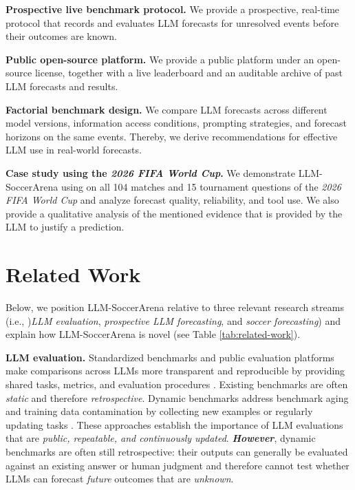 \documentclass[sigconf,nonacm]{acmart}
\newcommand{\arena}{\mbox{LLM-SoccerArena}\xspace}
\newcommand{\circnum}[2][tikzblue]{%
\tikz[baseline=-0.55ex]{
\node[
    circle,
    draw=#1,
    text=#1,
    line width=0.35pt,
    minimum size=1.0em,
    inner sep=0pt,
    font=\bfseries\fontsize{6.5}{6.5}\selectfont
] {#2};
}%
}
\begin{document}
\begin{tcolorbox}[
enhanced,
breakable,
colback=draftlight,
colframe=draftblue,
boxrule=0.8pt,
arc=2pt,
left=6pt,
right=6pt,
top=5pt,
bottom=5pt,
title={Our contributions},
fonttitle=\bfseries,
coltitle=white,
colbacktitle=draftblue
]
\textbf{\circnum[tikzblue]{1} Prospective live benchmark protocol.}
We provide a prospective, real-time protocol that records and evaluates LLM forecasts for unresolved events before their outcomes are known.

\smallskip
\textbf{\circnum[tikzblue]{2} Public open-source platform.}
We provide a public platform under an open-source license, together with a live leaderboard and an auditable archive of past LLM forecasts and results.

\smallskip
\textbf{\circnum[tikzblue]{3} Factorial benchmark design.}
We compare LLM forecasts across different model versions, information access conditions, prompting strategies, and forecast horizons on the same events. Thereby, we derive recommendations for effective LLM use in real-world forecasts.

\smallskip
\textbf{\circnum[tikzblue]{4} Case study using the \emph{2026 FIFA World Cup}.}
We demonstrate \arena using on all 104 matches and 15 tournament questions of the \emph{2026 FIFA World Cup} and analyze forecast quality, reliability, and tool use. We also provide a qualitative analysis of the mentioned evidence that is provided by the LLM to justify a prediction.
\end{tcolorbox}

\section{Related Work}
Below, we position \arena relative to three relevant research streams (i.e., )\emph{LLM evaluation}, \emph{prospective LLM forecasting}, and \emph{soccer forecasting}) and explain how \arena is novel (see Table \ref{tab:related-work}).

\textbf{LLM evaluation.}
Standardized benchmarks and public evaluation platforms make comparisons across LLMs more transparent and reproducible by providing shared tasks, metrics, and evaluation procedures \citep{dynaboard, liang2023holisticevaluationlanguagemodels, chiang2024chatbotarenaopenplatform}. Existing benchmarks are often \emph{static} and therefore \emph{retrospective}. \cite{frauenNonparametricLLMEvaluation2026, autocast, autocastpp} Dynamic benchmarks address benchmark aging and training data contamination by collecting new examples or regularly updating tasks \citep{dynabench,livebench,balunovic_etal_2025_matharena,chen_etal_2025_contamination}. These approaches establish the importance of LLM evaluations that are \emph{public, repeatable, and continuously updated}. \textbf{\emph{However}}, dynamic benchmarks are often still retrospective: their  outputs can generally be evaluated against an existing answer or human judgment and therefore cannot test whether LLMs can forecast \emph{future} outcomes that are \emph{unknown}. 
\end{document}
